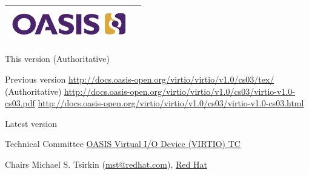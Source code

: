 \begin{titlepage}
\thispagestyle{fancy}

\begin{tabular*}{\textwidth}{@{\extracolsep{\fill}}lr}
	\includegraphics[height=0.55in]{images/oasis.png}\\
	\hline
\end{tabular*}

\oasistitle{\virtioversion}
\oasisstagelabel{\virtiodraftstagename\virtiodraftstageextratitle}
\vspace{0.05in}
\oasisstagelabel{\virtioworkingdraftdate}


\begin{oasistitlesection}{This version}
\virtiourltex{ }(Authoritative)\newline
\virtiourlpdf\newline
\virtiourlhtml
\end{oasistitlesection}

\begin{oasistitlesection}{Previous version}
\url{http://docs.oasis-open.org/virtio/virtio/v1.0/cs03/tex/}
{}(Authoritative)\newline
\url{http://docs.oasis-open.org/virtio/virtio/v1.0/cs03/virtio-v1.0-cs03.pdf}\newline
\url{http://docs.oasis-open.org/virtio/virtio/v1.0/cs03/virtio-v1.0-cs03.html}
\end{oasistitlesection}

\begin{oasistitlesection}{Latest version}
\virtiourllatestpdf\newline
\virtiourllatesthtml
\end{oasistitlesection}

\begin{oasistitlesection}{Technical Committee}
\href{https://www.oasis-open.org/committees/virtio/}{OASIS Virtual I/O Device (VIRTIO) TC}
\end{oasistitlesection}

\begin{oasistitlesection}{Chairs}
Michael S. Tsirkin (\href{mailto:mst@redhat.com}{mst@redhat.com}), \href{http://www.redhat.com/}{Red Hat}\newline
\end{oasistitlesection}


\end{titlepage}
